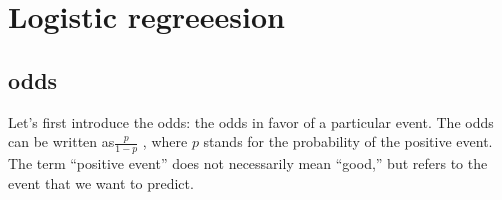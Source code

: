 \chapter{Logistic regreeesion}
\section{odds}
Let's first introduce the odds: the odds in favor of a particular event. The odds can be written as$\frac{p}{1-p}$ , where $p$ stands for the probability of the positive event. The term “positive event” does not necessarily mean “good,” but refers to the event that we want to predict.